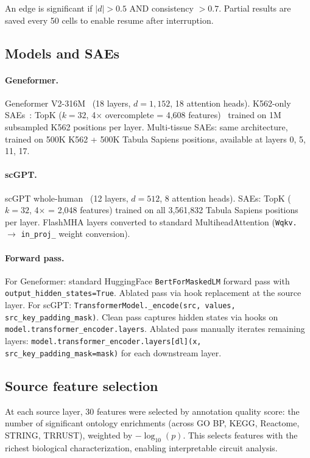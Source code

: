 \documentclass[onecolumn]{article}
\begin{document}
An edge is significant if $|d| > 0.5$ AND consistency $> 0.7$. Partial results are saved every 50 cells to enable resume after interruption.

\subsection{Models and SAEs}

\paragraph{Geneformer.} Geneformer V2-316M~\citep{theodoris2023transfer} (18 layers, $d{=}1{,}152$, 18 attention heads). K562-only SAEs~\citep{cunningham2023sparse,gao2024scaling}: TopK ($k{=}32$, 4$\times$ overcomplete = 4,608 features)~\citep{makhzani2013ksparse} trained on 1M subsampled K562 positions per layer. Multi-tissue SAEs: same architecture, trained on 500K K562 + 500K Tabula Sapiens positions, available at layers 0, 5, 11, 17.

\paragraph{scGPT.} scGPT whole-human~\citep{cui2024scgpt} (12 layers, $d{=}512$, 8 attention heads). SAEs: TopK ($k{=}32$, 4$\times$ = 2,048 features) trained on all 3,561,832 Tabula Sapiens positions per layer. FlashMHA layers converted to standard MultiheadAttention (\texttt{Wqkv.} $\to$ \texttt{in\_proj\_} weight conversion).

\paragraph{Forward pass.} For Geneformer: standard HuggingFace \texttt{BertForMaskedLM} forward pass with \texttt{output\_hidden\_states=True}. Ablated pass via hook replacement at the source layer. For scGPT: \texttt{TransformerModel.\_encode(src, values, src\_key\_padding\_mask)}. Clean pass captures hidden states via hooks on \texttt{model.transformer\_encoder.layers}. Ablated pass manually iterates remaining layers: \texttt{model.transformer\_encoder.layers[dl](x, src\_key\_padding\_mask=mask)} for each downstream layer.

\subsection{Source feature selection}

At each source layer, 30 features were selected by annotation quality score: the number of significant ontology enrichments (across GO BP, KEGG, Reactome, STRING, TRRUST), weighted by $-\log_{10}(p)$. This selects features with the richest biological characterization, enabling interpretable circuit analysis.
\end{document}

